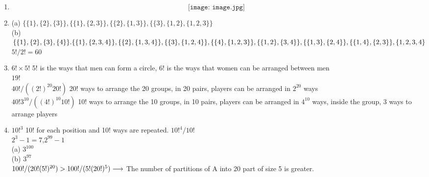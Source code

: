 \documentclass[12pt]{article}
\begin{document}
\begin{enumerate}
\item
{}
\[
\texttt{[image: image.jpg]} %
\]

\item
\vspace{0.15in}
(a) $\{\{1\},\{2\},\{3\}\},\{\{1\},\{2,3\}\},\{\{2\},\{1,3\}\},\{\{3\},\{1,2\},\{1,2,3\}\}$\\

(b) $\{\{1\},\{2\},\{3\},\{4\}\}.\{\{1\},\{2,3,4\}\},\{\{2\},\{1,3,4\}\},\\
\{\{3\},\{1,2,4\}\},\{\{4\},\{1,2,3\}\},\{\{1,2\},\{3,4\}\},\{\{1,3\},\{2,4\}\},\{\{1,4\},\{2,3\}\},\{1,2,3,4\}$\\

 $5!/2!=60$

\item
\vspace{0.15in}
 $6! \times 5!$ 5! is the ways that men can form a circle, 6! is the ways that women can be arranged between men\\
\vspace{0.15in}
 $19!$\\
 $40!/((2!)^{20}20!)$ 20! ways to arrange the 20 groups, in 20 pairs, players can be arranged in $2^{20}$ ways\\ $40!3^{10}/((4!)^{10}10!)$ 10! ways to arrange the 10 groups, in 10 pairs, players can be arranged in $4^{10}$ ways, inside the group, 3 ways to arrange players\\
\item 
{} $10!^{3}$ 10! for each position and 10! ways are repeated. $10!^{4}/10!$\\ 
 $2^{3}-1=7$,$2^{99}-1$\\
(a) $3^{100}$\\
(b) $3^{97}$ \\
 $100!/(20!(5!)^{20}) > 100!/(5!(20!)^{5})\\ \longrightarrow$ The number of partitions of A into 20 part of size 5 is greater.\\
\end{enumerate}
\end{document}
